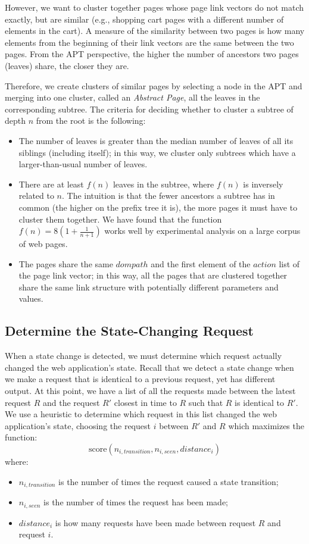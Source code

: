However, we want to cluster together pages whose page link vectors do not match
exactly, but are similar (e.g., shopping cart pages with a different number of
elements in the cart). A measure of the similarity between two pages is how
many elements from the beginning of their link vectors are the same between the
two pages. From the APT perspective, the higher the number of ancestors two
pages (leaves) share, the closer they are.

Therefore, we create clusters of similar pages by selecting a node in the APT
and merging into one cluster, called an \emph{Abstract Page}, all the leaves in
the corresponding subtree. The criteria for deciding whether to cluster a
subtree of depth $n$ from the root is the following:
\begin{itemize}
 \item The number of leaves is greater than the median number of leaves of all
   its siblings (including itself); in this way, we cluster only subtrees which
   have a larger-than-usual number of leaves.
 \item There are at least $f(n)$ leaves in the subtree, where $f(n)$ is
   inversely related to $n$. The intuition is that the fewer ancestors a subtree has in
   common (the higher on the prefix tree it is), the more pages it must have to
   cluster them together. We have found that the function $f(n) =
   8(1+\frac{1}{n+1})$ works well by experimental analysis on a large corpus of
   web pages.

 \item The pages share the same $dompath$ and the first element of the $action$
   list of the page link vector; in this way, all the pages that are clustered
   together share the same link structure with potentially different parameters
   and values.
\end{itemize}

\subsection{Determine the State-Changing Request}

When a state change is detected, we must determine which request actually
changed the web application's state. Recall that we detect a state change when
we make a request that is identical to a previous request, yet has different
output. At this point, we have a list of all the requests made between the
latest request $R$ and the request $R'$ closest in time to $R$ such that $R$ is
identical to $R'$. We use a heuristic to determine which request in this list
changed the web application's state, choosing the request $i$ between $R'$ and
$R$ which maximizes the function:
\[
\text{score}(n_{i,transition}, n_{i,seen}, distance_i)
\]
\noindent{}where:
\begin{itemize}
 \item $n_{i,transition}$ is the number of times the request caused a state transition;
 \item $n_{i,seen}$ is the number of times the request has been made;
 \item $distance_i$ is how many requests have been made between request $R$ and
   request $i$.
\end{itemize}

